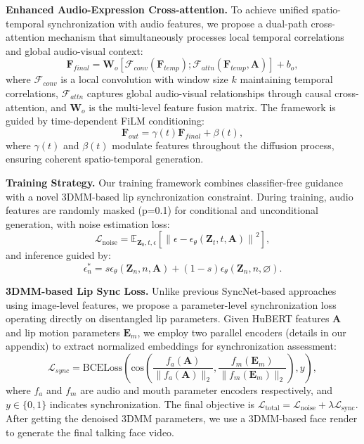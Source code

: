 \documentclass[conference]{IEEEtran}
\begin{document}
\noindent \textbf{Enhanced Audio-Expression Cross-attention.} 
To achieve unified spatio-temporal synchronization with audio features, we propose a dual-path cross-attention mechanism that simultaneously processes local temporal correlations and global audio-visual context:
\begin{equation}
    \mathbf{F}_{final} = \mathbf{W}_o[\mathcal{F}_{conv}(\mathbf{F}_{temp}); \mathcal{F}_{attn}(\mathbf{F}_{temp}, \mathbf{A})] + b_o,
\end{equation}
where $\mathcal{F}_{conv}$ is a local convolution with window size $k$ maintaining temporal correlations, $\mathcal{F}_{attn}$ captures global audio-visual relationships through causal cross-attention, and $\mathbf{W}_o$ is the multi-level feature fusion matrix. The framework is guided by time-dependent FiLM \cite{film} conditioning:
\begin{equation}
    \mathbf{F}_{out} = \gamma(t)\mathbf{F}_{final} + \beta(t),
\end{equation}
where $\gamma(t)$ and $\beta(t)$ modulate features throughout the diffusion process, ensuring coherent spatio-temporal generation.



\noindent \textbf{Training Strategy.} Our training framework combines classifier-free guidance \cite{classfree} with a novel 3DMM-based lip synchronization constraint. During training, audio features are randomly masked (p=0.1) for conditional and unconditional generation, with noise estimation loss:
\begin{equation} 
\mathcal{L}_{\text{noise}} = \mathbb{E}_{\mathbf{Z}_0, t, \epsilon} \left[ \left\| \epsilon - \epsilon_{\theta}(\mathbf{Z}_t, t, \mathbf{A}) \right\|^2 \right],
\end{equation} 
and inference guided by:
\begin{equation} 
\epsilon^{*}_{n} = s \epsilon_{\theta}(\mathbf{Z}_n, n, \mathbf{A}) + (1 - s) \epsilon_{\theta}(\mathbf{Z}_n, n, \varnothing).
\end{equation}


\noindent \textbf{3DMM-based Lip Sync Loss.} Unlike previous SyncNet-based \cite{wav2lip} approaches using image-level features, we propose a parameter-level synchronization loss operating directly on disentangled lip parameters. Given HuBERT features $\mathbf{A}$ and lip motion parameters $\mathbf{E}_m$, we employ two parallel encoders (details in our appendix) to extract normalized embeddings for synchronization assessment:
\begin{equation}
\mathcal{L}_{sync} = \text{BCELoss}(\text{cos}(\frac{f_a(\mathbf{A})}{\|f_a(\mathbf{A})\|_2}, \frac{f_m(\mathbf{E}_m)}{\|f_m(\mathbf{E}_m)\|_2}), y),
\end{equation}
where $f_a$ and $f_m$ are audio and mouth parameter encoders respectively, and $y \in \{0,1\}$ indicates synchronization. The final objective is $\mathcal{L}_{\text{total}} = \mathcal{L}_{\text{noise}} + \lambda \mathcal{L}_{\text{sync}}$. After getting the denoised 3DMM parameters, we use a 3DMM-based face render \cite{pir} to generate the final talking face video.
\end{document}
